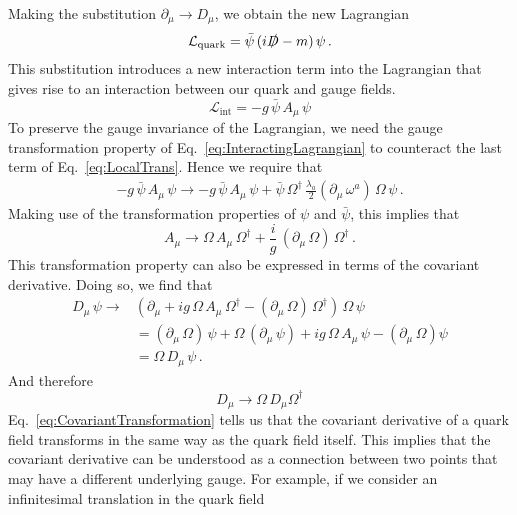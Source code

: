 Making the substitution $\partial_\mu\rightarrow D_\mu$, we obtain the new Lagrangian
%
\begin{equation}
\mathcal{L}_\text{quark} = \bar{\psi}\,(i\slashed{D}-m)\,\psi\,.
\end{equation}
%
This substitution introduces a new interaction term into the Lagrangian that gives rise to an interaction between our quark and gauge fields.
%
\begin{equation}
\mathcal{L}_\text{int} = -g\,\bar{\psi}\,A_\mu\,\psi
\label{eq:InteractingLagrangian}
\end{equation}
%
To preserve the gauge invariance of the Lagrangian, we need the gauge transformation property of Eq.~\eqref{eq:InteractingLagrangian} to counteract the last term of Eq.~\eqref{eq:LocalTrans}. Hence we require that
%
\begin{align}
-g\,\bar{\psi}\,A_\mu\,\psi \rightarrow -g\,\bar{\psi}\,A_\mu\,\psi + \bar{\psi}\,\Omega^\dag\,\frac{\lambda_a}{2}(\partial_\mu\,\omega^a)\,\Omega\,\psi\, .
\end{align}
%
Making use of the transformation properties of $\psi$ and $\bar{\psi}$, this implies that
%
\begin{equation}
A_\mu\rightarrow \Omega\,A_\mu\,\Omega^\dag + \frac{i}{g}\,(\partial_\mu\,\Omega)\,\Omega^\dag\, . 
\label{eq:GaugePotentialTrans}
\end{equation}
%
This transformation property can also be expressed in terms of the covariant derivative. Doing so, we find that
%
\begin{align}
D_\mu\,\psi \rightarrow &\left(\partial_\mu +ig\,\Omega\,A_\mu\,\Omega^\dag - (\partial_\mu\,\Omega)\,\Omega^\dag\right)\,\Omega\,\psi\nonumber\\
&= (\partial_\mu\,\Omega)\,\psi + \Omega\,(\partial_\mu\,\psi) + ig\,\Omega\,A_\mu\,\psi - (\partial_\mu\,\Omega)\psi\nonumber\\
&=\Omega\,D_\mu\,\psi\, .\label{eq:CovariantTransformation}
\end{align}
%
And therefore
%
\begin{equation}
D_{\mu}\rightarrow\Omega\,D_\mu \Omega^\dag
\end{equation}
%
Eq.~\eqref{eq:CovariantTransformation} tells us that the covariant derivative of a quark field transforms in the same way as the quark field itself. This implies that the covariant derivative can be understood as a connection between two points that may have a different underlying gauge. For example, if we consider an infinitesimal translation in the quark field
